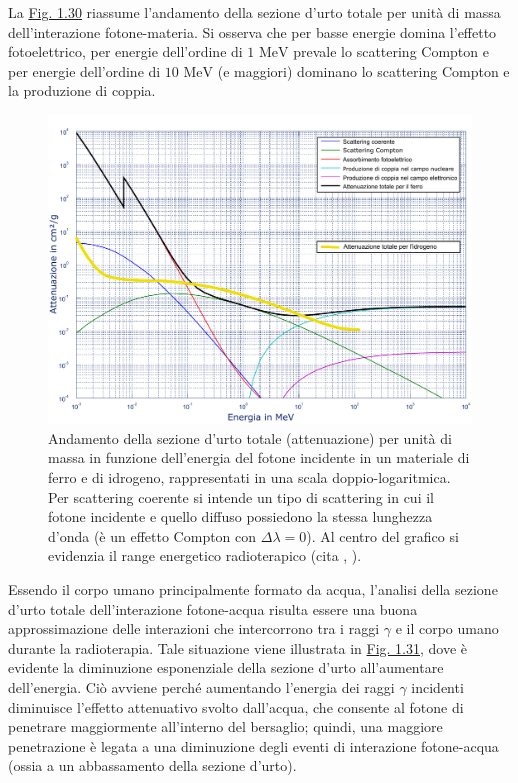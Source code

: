 \documentclass[12pt,a4paper,twoside]{report}
\begin{document}
	La \hyperref[fig:attenuation]{Fig. 1.30} riassume l'andamento della sezione d'urto totale per unità di massa dell'interazione fotone-materia. Si osserva che per basse energie domina l'effetto fotoelettrico, per energie dell'ordine di $1\mbox{ MeV}$ prevale lo scattering Compton e per energie dell'ordine di $10\mbox{ MeV}$ (e maggiori) dominano lo scattering Compton e la produzione di coppia.
	\begin{figure}[H]
		\centering
		\includegraphics[width=0.9\linewidth]{attenuation.pdf}
		\caption{Andamento della sezione d'urto totale (attenuazione) per unità di massa in funzione dell'energia del fotone incidente in un materiale di ferro e di idrogeno, rappresentati in una scala doppio-logaritmica. Per scattering coerente si intende un tipo di scattering in cui il fotone incidente e quello diffuso possiedono la stessa lunghezza d'onda (è un effetto Compton con $\Delta \lambda=0$). Al centro del grafico si evidenzia il range energetico radioterapico (cita
			,
			).}
		\label{fig:attenuation}
	\end{figure}
	Essendo il corpo umano principalmente formato da acqua, l'analisi della sezione d'urto totale dell'interazione fotone-acqua risulta essere una buona approssimazione delle interazioni che intercorrono tra i raggi $\gamma$ e il corpo umano durante la radioterapia. Tale situazione viene illustrata in \hyperref[fig:attenuation_water]{Fig. 1.31}, dove è evidente la diminuzione esponenziale della sezione d'urto all'aumentare dell'energia. Ciò avviene perché aumentando l'energia dei raggi $\gamma$ incidenti diminuisce l'effetto attenuativo svolto dall'acqua, che consente al fotone di penetrare maggiormente all'interno del bersaglio; quindi, una maggiore penetrazione è legata a una diminuzione degli eventi di interazione fotone-acqua (ossia a un abbassamento della sezione d'urto).
\end{document}
